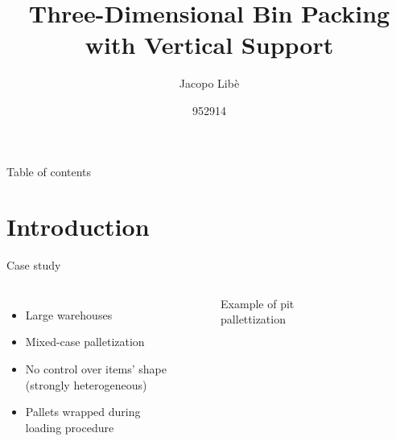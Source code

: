 \documentclass{beamer}
\title{Three-Dimensional Bin Packing \\ with Vertical Support}
\subtitle{}
\author{Jacopo Libè}
\date{952914}
\begin{document}
    \begin{frame}
        \maketitle
    \end{frame}
    
    \begin{frame}{Table of contents}
      \tableofcontents
    \end{frame}
    
    \section{Introduction}
    \begin{frame}{Case study}
        \begin{columns}[onlytextwidth,T]
            \column{\dimexpr\linewidth-55mm-5mm}
                \begin{itemize}
                    \item Large warehouses
                    \item Mixed-case palletization
                    \item No control over items' shape (strongly heterogeneous)
                    \item Pallets wrapped during loading procedure
                \end{itemize}
                \vspace{-5mm}
                \begin{figure}[H]
                    \caption*{Example of pit pallettization} %
                \end{figure}
            \column{55mm}
                \begin{figure}

\end{figure}
\end{columns}
\end{frame}
\end{document}
